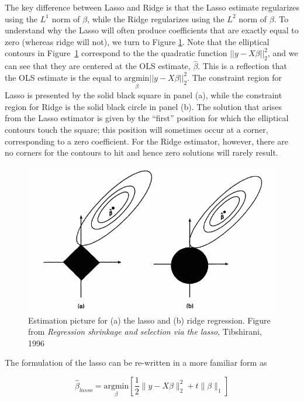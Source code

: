 The key difference between Lasso and Ridge is that the Lasso estimate regularizes using the $L^1$ norm of $\beta$, while the Ridge regularizes using the $L^2$ norm of $\beta$. To understand why the Lasso will often produce coefficients that are exactly equal to zero (whereas ridge will not), we turn to Figure \ref{fig:ridge_lasso}. Note that the elliptical contours in Figure~\ref{fig:ridge_lasso} correspond to the the quadratic function $||y - X\beta||_2^2$, and we can see that they are centered at the OLS estimate, $\hat{\beta}$. This is a reflection that the OLS estimate is the equal to $\underset{\beta}{\text{argmin}}||y - X\beta||_2^2$. The constraint region for Lasso is presented by the solid black square in panel (a), while the constraint region for Ridge is the solid black circle in panel (b). The solution that arises from the Lasso estimator is given by the ``first'' position for which the elliptical contours touch the square; this position will sometimes occur at a corner, corresponding to a zero coefficient. For the Ridge estimator, however, there are no corners for the contours to hit and hence zero solutions will rarely result.




\begin{figure}[H]
\centering
\includegraphics[scale=0.4]{lasso.png}
\caption{Estimation picture for (a) the lasso and (b) ridge regression. Figure from \emph{Regression shrinkage and selection via the lasso}, Tibshirani, 1996}
\label{fig:ridge_lasso}
\end{figure}


The formulation of the lasso can be re-written in a more familiar form as

\begin{equation}
\label{eq:lasso1}
\hat{\beta}_{lasso} = \underset{\beta}{\text{argmin}} \left[ \frac12 \| y - X \beta \|_2^2 + t \|\beta \|_1 \right]
\end{equation}

